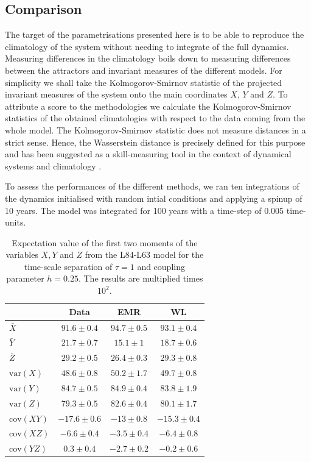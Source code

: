 \documentclass[12pt]{article}
\begin{document}
\subsection{Comparison}

The target of the parametrisations presented here is to be able to reproduce the climatology of the system without needing to integrate of the full dynamics. Measuring differences in the climatology boils down to measuring differences between the attractors and invariant measures of the different models. For simplicity we shall take the Kolmogorov-Smirnov statistic of the projected invariant measures of the system onto the main coordinates $X$, $Y$ and $Z$. To attribute a score to the methodologies we calculate the Kolmogorov-Smirnov statistics of the obtained climatologies with respect to the data coming from the whole model. The Kolmogorov-Smirnov statistic does not measure distances in a strict sense. Hence, the Wasserstein distance \cite{villani} is precisely defined for this purpose and has been suggested as a skill-measuring tool in the context of dynamical systems and climatology \cite{robin2017, Vissio2018b}. 

To assess the performances of the different methods, we ran ten integrations of the dynamics initialised with random intial conditions and applying a spinup of 10 years. The model was integrated for 100 years with a time-step of 0.005 time-units.
\begin{table}[H]
	\centering
	\begin{tabular}{l | ccc}
		& Data & EMR  & WL \\ 
		\hline 
		$\bar{X}$&$91.6 \pm 0.4$ &$ 94.7 \pm 0.5 $&$ 93.1 \pm 0.4 $\\ 
		$\bar{Y}$&$21.7 \pm 0.7 $&$ 15.1 \pm 1 $&$ 18.7 \pm 0.6 $\\ 
		$\bar{Z}$&$29.2 \pm 0.5 $& $26.4 \pm 0.3 $& $29.3 \pm 0.8 $\\ 
		$\mathrm{var}(X)$&$48.6 \pm 0.8 $& $50.2 \pm 1.7 $& $49.7 \pm 0.8$ \\ 
		$\mathrm{var}(Y)$&$84.7 \pm 0.5 $&$ 84.9 \pm 0.4$ &$ 83.8 \pm 1.9 $\\ 
		$\mathrm{var}(Z)$&$79.3 \pm 0.5 $& $82.6 \pm 0.4 $&$ 80.1 \pm 1.7$ \\ 
		$\mathrm{cov}(XY)$&$-17.6 \pm 0.6 $& $-13 \pm 0.8 $& $-15.3 \pm 0.4$ \\ 
		$\mathrm{cov}(XZ)$&$-6.6 \pm 0.4 $&$ -3.5 \pm 0.4 $& $-6.4 \pm 0.8$ \\ 
		$\mathrm{cov}(YZ)$&$0.3 \pm 0.4 $& $-2.7 \pm 0.2$ & $-0.2 \pm 0.6$ \\ 
	\end{tabular}
	\caption{\label{tablemoments1}Expectation value of the first two moments of the variables $X,Y$ and $Z$ from the L84-L63 model for the time-scale separation of $\tau = 1$ and coupling parameter $h=0.25$. The results are multiplied times $10^2$.}
\end{table}
\end{document}
